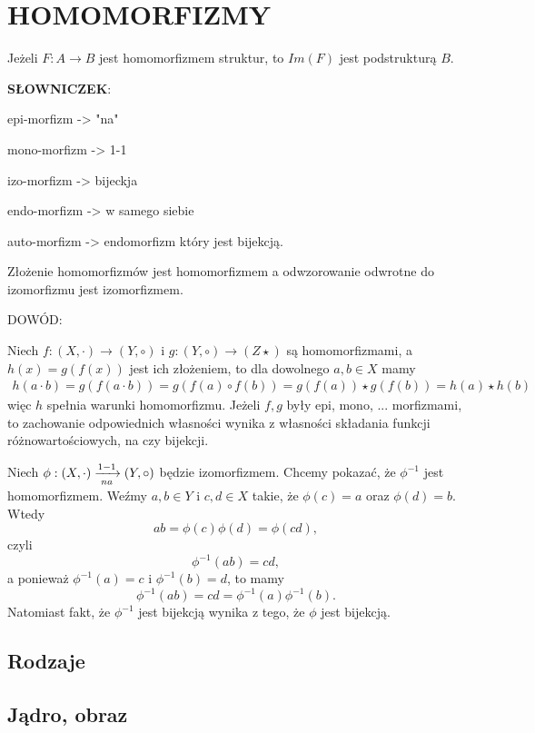 \section{HOMOMORFIZMY}

Jeżeli $F:A\to B$ jest homomorfizmem struktur, to $Im(F)$ jest podstrukturą $B$.
\bigskip

\pdef
\textbf{\color{def}SŁOWNICZEK}:
\smallskip

    \point epi-morfizm -> "na"

    \point mono-morfizm -> 1-1

    \point izo-morfizm -> bijeckja

    \point endo-morfizm -> w samego siebie

    \point auto-morfizm -> endomorfizm który jest bijekcją.
\smallskip

\kdef
\medskip

{\color{acc}Złożenie homomorfizmów jest homomorfizmem} a odwzorowanie odwrotne do izomorfizmu jest izomorfizmem.
\medskip

{\color{def}DOWÓD:}
\smallskip

Niech $f:(X, \cdot)\to(Y, \circ)$ i $g:(Y, \circ)\to(Z\star)$ są homomorfizmami, a $h(x)=g(f(x))$ jest ich złożeniem, to dla dowolnego $a,b\in X$ mamy
\begin{align*}
    h(a\cdot b)=g(f(a\cdot b))=g(f(a)\circ f(b))=g(f(a))\star g(f(b))=h(a)\star h(b)
\end{align*}
więc $h$ spełnia warunki homomorfizmu. Jeżeli $f, g$ były epi, mono, ... morfizmami, to zachowanie odpowiednich własności wynika z własności składania funkcji różnowartościowych, na czy bijekcji.
\smallskip

Niech $\phi:(X, \cdot)\xrightarrow[na]{1-1} (Y, \circ)$ będzie izomorfizmem. Chcemy pokazać, że $\phi^{-1}$ jest homomorfizmem. Weźmy $a, b\in Y$ i $c, d\in X$ takie, że $\phi(c)=a$ oraz $\phi(d)=b$. Wtedy
$$ab=\phi(c)\phi(d)=\phi(cd),$$
czyli
$$\phi^{-1}(ab)=cd,$$
a ponieważ $\phi^{-1}(a)=c$ i $\phi^{-1}(b)=d$, to mamy
$$\phi^{-1}(ab)=cd=\phi^{-1}(a)\phi^{-1}(b).$$
Natomiast fakt, że $\phi^{-1}$ jest bijekcją wynika z tego, że $\phi$ jest bijekcją.

\subsection{Rodzaje}

\subsection{Jądro, obraz}

